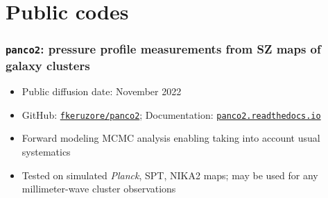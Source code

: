\section{Public codes}

\subsubsection{\texttt{panco2}: pressure profile measurements from SZ maps of galaxy clusters}

\vspace{5pt}
\begin{itemize}
    \setlength{\itemsep}{0pt}
    \item Public diffusion date: November 2022
    \item GitHub: \href{https://github.com/fkeruzore/panco2}{\texttt{fkeruzore/panco2}}; Documentation: \href{https://panco2.readthedocs.io/en/latest/}{\texttt{panco2.readthedocs.io}}
    \item Forward modeling MCMC analysis enabling taking into account usual systematics
    \item Tested on simulated \textit{Planck}, SPT, NIKA2 maps; may be used for any \\ millimeter-wave cluster observations
\end{itemize} 
